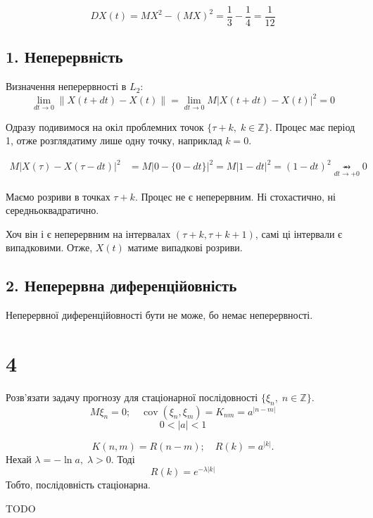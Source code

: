 \documentclass[11pt, a4paper]{article} %
\DeclareMathOperator{\cov}{cov}
\begin{document}
\[DX(t) = MX^2 - (MX)^2 = \frac{1}{3} - \frac{1}{4} = \frac{1}{12}\]

\subsection*{1. Неперервність}
Визначення неперервності в $L_2$:
\[\lim_{dt \to 0} \|X(t+dt)-X(t)\| = \lim_{dt\to 0 }M\left|X(t+dt)-X(t)\right|^2 = 0\]

Одразу подивимося на окіл проблемних точок $\{\tau+k,\; k\in\mathbb Z\}$.
Процес має період 1, отже розглядатиму лише одну точку, наприклад $k=0$.

\begin{align*}
    M\left|X(\tau)-X(\tau-dt)\right|^2 &= M\left|0-\{0-dt\}\right|^2 = M\left|1-dt\right|^2 = (1-dt)^2 \underset{dt \to +0}{\rightarrowx} 0
\end{align*}

Маємо розриви в точках $\tau+k$. Процес не є неперервним. Ні стохастично, ні середньоквадратично. 

Хоч він і є неперервним на інтервалах $(\tau+k, \tau+k+1)$, самі ці інтервали є випадковими. 
Отже, $X(t)$ матиме випадкові розриви.


\subsection*{2. Неперервна диференційовність}
Неперервної диференційовності бути не може, бо немає неперервності.


\section*{4}
\begin{mdframed}
    Розв'язати задачу прогнозу для стаціонарної послідовності $\{\xi_n,\;n\in\mathbb Z\}$.
    \[M\xi_n = 0; \quad \cov(\xi_n,\xi_m) = K_{nm} = a^{|n-m|}\]
    \[0<|a|<1\]
\end{mdframed}

\[K(n,m) = R(n-m); \quad R(k) = a^{|k|}.\]
Нехай $\lambda = -\ln a, \; \lambda > 0$.
Тоді 
\[R(k) = e^{-\lambda|k|}\]
Тобто, послідовність стаціонарна.

TODO
\end{document}
